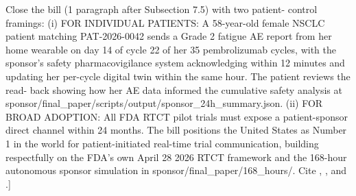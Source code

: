 Close the bill (1 paragraph after Subsection 7.5) with two patient-
control framings:
(i) FOR INDIVIDUAL PATIENTS: A 58-year-old female NSCLC patient
    matching PAT-2026-0042 sends a Grade 2 fatigue AE report from
    her home wearable on day 14 of cycle 22 of her 35 pembrolizumab
    cycles, with the sponsor's safety pharmacovigilance system
    acknowledging within 12 minutes and updating her per-cycle
    digital twin within the same hour. The patient reviews the read-
    back showing how her AE data informed the cumulative safety
    analysis at sponsor/final\_paper/scripts/output/sponsor\_24h\_summary.json.
(ii) FOR BROAD ADOPTION: All FDA RTCT pilot trials must expose a
     patient-sponsor direct channel within 24 months. The bill
     positions the United States as Number 1 in the world for
     patient-initiated real-time trial communication, building
     respectfully on the FDA's own April 28 2026 RTCT framework and
     the 168-hour autonomous sponsor simulation in
     sponsor/final\_paper/168\_hours/. Cite \cite{kawchak_2026_19396256},
     \cite{kawchak_2026_19994945}, and \cite{fda_rtct_press_2026}.]
